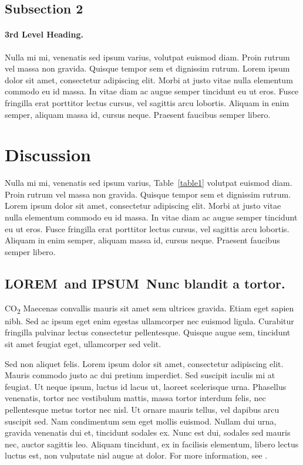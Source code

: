 \documentclass[10pt,letterpaper]{article}
\newcommand{\lorem}{{\bf LOREM}}
\newcommand{\ipsum}{{\bf IPSUM}}
\begin{document}
\subsection*{Subsection 2}
\paragraph{3rd Level Heading.} Nulla mi mi, venenatis sed ipsum varius, volutpat euismod diam. Proin rutrum vel massa non gravida. Quisque tempor sem et dignissim rutrum. Lorem ipsum dolor sit amet, consectetur adipiscing elit. Morbi at justo vitae nulla elementum commodo eu id massa. In vitae diam ac augue semper tincidunt eu ut eros. Fusce fringilla erat porttitor lectus cursus, vel sagittis arcu lobortis. Aliquam in enim semper, aliquam massa id, cursus neque. Praesent faucibus semper libero.

\section*{Discussion}
Nulla mi mi, venenatis sed ipsum varius, Table~\ref{table1} volutpat euismod diam. Proin rutrum vel massa non gravida. Quisque tempor sem et dignissim rutrum. Lorem ipsum dolor sit amet, consectetur adipiscing elit. Morbi at justo vitae nulla elementum commodo eu id massa. In vitae diam ac augue semper tincidunt eu ut eros. Fusce fringilla erat porttitor lectus cursus, vel sagittis arcu lobortis. Aliquam in enim semper, aliquam massa id, cursus neque. Praesent faucibus semper libero.

\subsection*{\lorem\ and \ipsum\ Nunc blandit a tortor.}

CO\textsubscript{2} Maecenas convallis mauris sit amet sem ultrices gravida. Etiam eget sapien nibh. Sed ac ipsum eget enim egestas ullamcorper nec euismod ligula. Curabitur fringilla pulvinar lectus consectetur pellentesque. Quisque augue sem, tincidunt sit amet feugiat eget, ullamcorper sed velit. 

Sed non aliquet felis. Lorem ipsum dolor sit amet, consectetur adipiscing elit. Mauris commodo justo ac dui pretium imperdiet. Sed suscipit iaculis mi at feugiat. Ut neque ipsum, luctus id lacus ut, laoreet scelerisque urna. Phasellus venenatis, tortor nec vestibulum mattis, massa tortor interdum felis, nec pellentesque metus tortor nec nisl. Ut ornare mauris tellus, vel dapibus arcu suscipit sed. Nam condimentum sem eget mollis euismod. Nullam dui urna, gravida venenatis dui et, tincidunt sodales ex. Nunc est dui, sodales sed mauris nec, auctor sagittis leo. Aliquam tincidunt, ex in facilisis elementum, libero lectus luctus est, non vulputate nisl augue at dolor. For more information, see .
\end{document}
